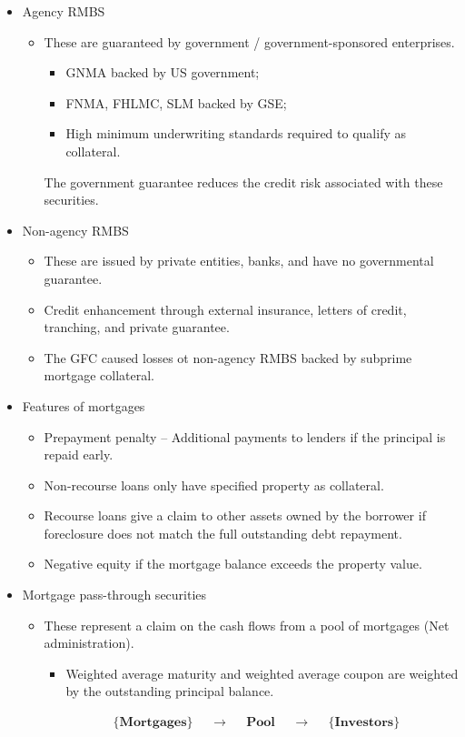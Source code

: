 \documentclass[../notes_compiled.tex]{subfiles}
\begin{document}
\begin{itemize}
\item Agency RMBS
\begin{itemize}
\item These are guaranteed by government / government-sponsored enterprises.
\begin{itemize}
\item GNMA backed by US government;
\item FNMA, FHLMC, SLM backed by GSE;
\item High minimum underwriting standards required to qualify as collateral.
\end{itemize}
The government guarantee reduces the credit risk associated with these securities.
\end{itemize}

\item Non-agency RMBS
\begin{itemize}
\item These are issued by private entities, banks, and have no governmental guarantee.
\item Credit enhancement through external insurance, letters of credit, tranching, and private guarantee.
\item The GFC caused losses ot non-agency RMBS backed by subprime mortgage collateral.
\end{itemize}

\item Features of mortgages
\begin{itemize}
\item Prepayment penalty -- Additional payments to lenders if the principal is repaid early.
\item Non-recourse loans only have specified property as collateral.
\item Recourse loans give a claim to other assets owned by the borrower if foreclosure does not match the full outstanding debt repayment.
\item Negative equity if the mortgage balance exceeds the property value.
\end{itemize}

\item Mortgage pass-through securities
\begin{itemize}
\item These represent a claim on the cash flows from a pool of mortgages (Net administration).
\begin{itemize}
\item Weighted average maturity and weighted average coupon are weighted by the outstanding principal balance.
\end{itemize}
\begin{align*}
&& &\textbf{\{Mortgages\}} & &\longrightarrow & &\textbf{Pool} & &\longrightarrow & &\textbf{\{Investors\}} &&
\end{align*}
\end{itemize}


\end{itemize}
\end{document}
